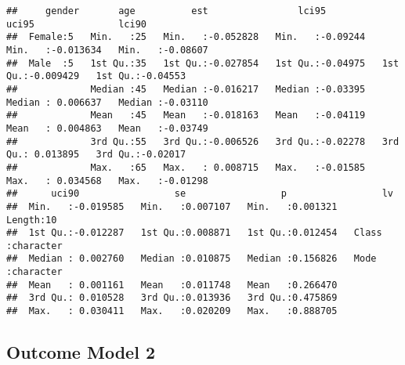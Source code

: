 \documentclass[
]{article}
\begin{document}
\begin{verbatim}
##     gender       age          est                lci95              uci95               lci90         
##  Female:5   Min.   :25   Min.   :-0.052828   Min.   :-0.09244   Min.   :-0.013634   Min.   :-0.08607  
##  Male  :5   1st Qu.:35   1st Qu.:-0.027854   1st Qu.:-0.04975   1st Qu.:-0.009429   1st Qu.:-0.04553  
##             Median :45   Median :-0.016217   Median :-0.03395   Median : 0.006637   Median :-0.03110  
##             Mean   :45   Mean   :-0.018163   Mean   :-0.04119   Mean   : 0.004863   Mean   :-0.03749  
##             3rd Qu.:55   3rd Qu.:-0.006526   3rd Qu.:-0.02278   3rd Qu.: 0.013895   3rd Qu.:-0.02017  
##             Max.   :65   Max.   : 0.008715   Max.   :-0.01585   Max.   : 0.034568   Max.   :-0.01298  
##      uci90                 se                 p                 lv           
##  Min.   :-0.019585   Min.   :0.007107   Min.   :0.001321   Length:10         
##  1st Qu.:-0.012287   1st Qu.:0.008871   1st Qu.:0.012454   Class :character  
##  Median : 0.002760   Median :0.010875   Median :0.156826   Mode  :character  
##  Mean   : 0.001161   Mean   :0.011748   Mean   :0.266470                     
##  3rd Qu.: 0.010528   3rd Qu.:0.013936   3rd Qu.:0.475869                     
##  Max.   : 0.030411   Max.   :0.020209   Max.   :0.888705
\end{verbatim}

\hypertarget{outcome-model-2-1}{%
\subsection{Outcome Model 2}\label{outcome-model-2-1}}
\end{document}
